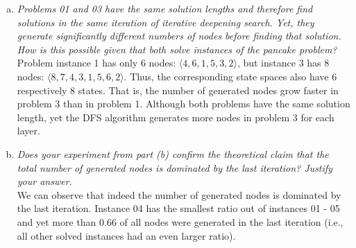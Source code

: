 \documentclass{article} %
\begin{document}
\begin{enumerate}[(a)]
    \item \textit{Problems 01 and 03 have the same solution lengths and therefore find solutions in the same
    iteration of iterative deepening search. Yet, they generate significantly different numbers of
    nodes before finding that solution. How is this possible given that both solve instances of
    the pancake problem?}\\[0.5em]
    Problem instance 1 has only 6 nodes: $\langle 4, 6, 1, 5, 3, 2 \rangle$,
    but instance 3 has 8 nodes: $\langle 8, 7, 4, 3, 1, 5, 6, 2 \rangle$.
    Thus, the corresponding state spaces also have 6 respectively 8 states.
    That is, the number of generated nodes grow faster in problem 3 than
    in problem 1. Although both problems have the same solution length, yet
    the DFS algorithm generates more nodes in problem 3 for each layer.
    
    \item \textit{Does your experiment from part (b) confirm the
    theoretical claim that the total number of generated nodes
    is dominated by the last iteration? Justify your answer.}\\[0.5em]
    We can observe that indeed the number of generated nodes
    is dominated by the last iteration. Instance 04 has the smallest
    ratio out of instances 01 - 05 and yet more than 0.66 of all
    nodes were generated in the last iteration (i.e., all other
    solved instances had an even larger ratio).
\end{enumerate}
\end{document}
